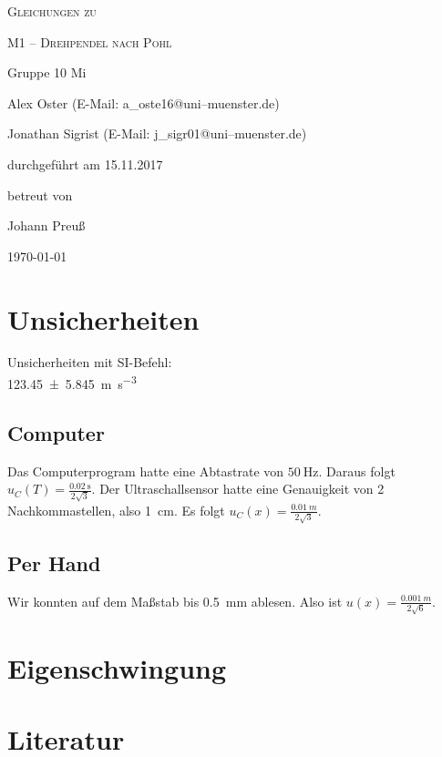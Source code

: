 \documentclass[11pt,a4paper,titlepage, ngerman]{article}
\begin{document}
	
	
	\begin{titlepage}
		
		\centering
		{\scshape\LARGE Gleichungen zu \par}
		\vspace{1cm}
		{\scshape\huge M1 -- Drehpendel nach Pohl\par}
		\vspace{2.5cm}
		{\LARGE Gruppe 10 Mi\par}
		\vspace{0.5cm}
		{\large Alex Oster (E-Mail: a\_oste16@uni--muenster.de) \par}
		{\large Jonathan Sigrist (E-Mail: j\_sigr01@uni--muenster.de) \par}
		\vfill
		durchgeführt am 15.11.2017\par
		betreut von\par
		{\large Johann Preuß}		
		\vfill	
		{\large \today\par}
		
	\end{titlepage}
		
	\tableofcontents
		
	\newpage
	
	\section{Unsicherheiten}
	Unsicherheiten mit SI-Befehl:\\
	 \SI{123.45 +- 5.845}{\meter\per\second\cubed}
	
	
	\subsection*{Computer}
	Das Computerprogram hatte eine Abtastrate von $\SI{50}{\hertz}$. Daraus folgt $u_C(T) = \frac{\SI{0,02}{\second}}{2\sqrt{3}}$.
	Der Ultraschallsensor hatte eine Genauigkeit von 2 Nachkommastellen, also \SI{1}{cm}. Es folgt $u_C(x) = \frac{\SI{0,01}{m}}{2\sqrt{3}}$.
	
	\subsection*{Per Hand}
	Wir konnten auf dem Maßstab bis \SI{0,5}{mm} ablesen. Also ist $u(x) = \frac{\SI{0,001}{m}}{2\sqrt{6}}$.
	
	\section{Eigenschwingung}

	\newpage			
	\section*{Literatur}
\end{document}
